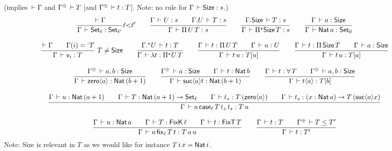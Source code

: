 \documentclass[acmlarge,review,anonymous]{acmart}\settopmatter{printfolios=true}
\begin{document}
  (implies $\,\vdash \Gamma$ and $\resurrect \Gamma \der T$ [and $\resurrect \Gamma \der t : T$]. Note: no rule for $\Gamma \,\vdash \mathsf{Size} : s$.)
\begin{gather*}
  \ru{\der \Gamma
    }{\Gamma \der \Set[\ell] : \Set[\ell']
    }{\ell {<} \ell'}
\qquad
  \ru{\Gamma \der U : s \qquad
      \cext \Gamma U \der T : s
    }{\Gamma \der \piT U T : s}
\qquad
  \ru{\cext \Gamma \Size \der T : s
    }{\Gamma \der \epiT \Size T : s}
\qquad
  \ru{%
      \Gamma \der a : \Size
    }{\Gamma \der \Nat a : \Set[0]}
\\[2ex]
  \rux{\der \Gamma \qquad \Gamma(i) = \erann[\noterased] T
    }{\Gamma \der \ind i : T
    }{T \not= \Size}
\qquad
  \ru{\eext \Gamma U \der t : T
    }{\Gamma \der \lambda t : \epiT U T}
\qquad
  \ru{\Gamma \der t : \piT U T \qquad
      \Gamma \der u : U
    }{\Gamma \der t\,u : T[u]}
\qquad
  \ru{\Gamma \der t : \piT \Size T \qquad
      \Gamma \der a : \Size
    }{\Gamma \der t\,a : T[a]}
\\[2ex] %
  \ru{%
      \resurrect\Gamma \der a, b : \Size
    }{\Gamma \der \zero{a} : \Nat (b + 1)}
\qquad
  \ru{\resurrect\Gamma \der a : \Size \qquad
      \Gamma \der t : \Nat b
    }{\Gamma \der \suc a t : \Nat (b + 1)}
\qquad
  \ru{\Gamma \der t : \forallT T \qquad
      \resurrect\Gamma \der a,b : \Size
    }{\Gamma \der t \ann a : T[b]}
\\[2ex]
  \ru{\Gamma \der u : \Nat (a + 1) \qquad
      \Gamma \der T : \Nat (a + 1) \to \Set[\ell] \qquad
      \Gamma \der t_z : T \, (\zero{a}) \qquad
      \Gamma \der t_s : (x : \Nat a) \to T \, (\suc{a} x)
    }{\Gamma \der u\,\case[\ell] T {t_z} t_s : T \, u}
\\[2ex]
  \ru{\Gamma \der u : \Nat a \qquad
      \Gamma \der T : \FixK\,\ell \qquad %
      \Gamma \der t : \FixT\, T
     }{\Gamma \der u\,\fix[\ell] T t : T \,a \, u}
\qquad
  \ru{\Gamma \der t : T \qquad
      \resurrect\Gamma \der T \leq T'
     }{\Gamma \der t : T'}
\end{gather*}
Note: Size is relevant in $T$ as we would like for instance $T\,i\,x = \mathsf{Nat}\, i$.
\end{document}
